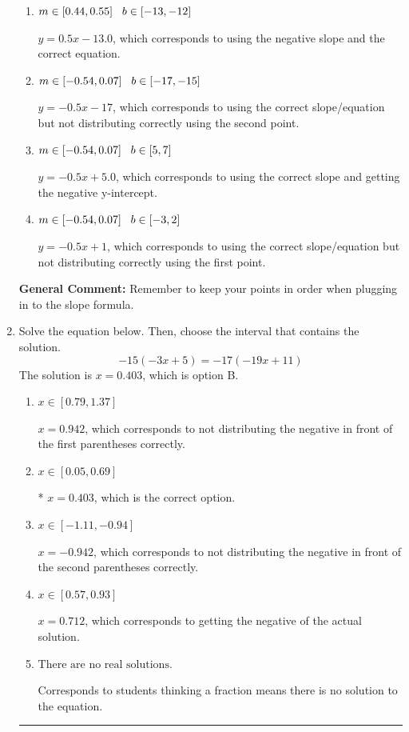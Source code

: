 \documentclass{extbook}[14pt]
\newcommand{\litem}[1]{\item #1

\rule{\textwidth}{0.4pt}}
\begin{document}
\begin{enumerate}
{\begin{enumerate}[label=\Alph*.]
* $y = -0.5x -5.0$, which is the correct option.
\item \( m \in [0.44, 0.55] \hspace*{3mm} b \in [-13, -12] \)

 $y = 0.5x -13.0$, which corresponds to using the negative slope and the correct equation.
\item \( m \in [-0.54, 0.07] \hspace*{3mm} b \in [-17, -15] \)

 $y = -0.5x -17$, which corresponds to using the correct slope/equation but not distributing correctly using the second point.
\item \( m \in [-0.54, 0.07] \hspace*{3mm} b \in [5, 7] \)

 $y = -0.5x + 5.0$, which corresponds to using the correct slope and getting the negative y-intercept.
\item \( m \in [-0.54, 0.07] \hspace*{3mm} b \in [-3, 2] \)

 $y = -0.5x + 1$, which corresponds to using the correct slope/equation but not distributing correctly using the first point.
\end{enumerate}

\textbf{General Comment:} Remember to keep your points in order when plugging in to the slope formula.
}
\litem{
Solve the equation below. Then, choose the interval that contains the solution.
\[ -15(-3x + 5) = -17(-19x + 11) \]The solution is \( x = 0.403 \), which is option B.\begin{enumerate}[label=\Alph*.]
\item \( x \in [0.79, 1.37] \)

$x = 0.942$, which corresponds to not distributing the negative in front of the first parentheses correctly.
\item \( x \in [0.05, 0.69] \)

* $x = 0.403$, which is the correct option.
\item \( x \in [-1.11, -0.94] \)

$x = -0.942$, which corresponds to not distributing the negative in front of the second parentheses correctly.
\item \( x \in [0.57, 0.93] \)

$x = 0.712$, which corresponds to getting the negative of the actual solution.
\item \( \text{There are no real solutions.} \)

Corresponds to students thinking a fraction means there is no solution to the equation.
\end{enumerate}

}
\end{enumerate}
\end{document}
